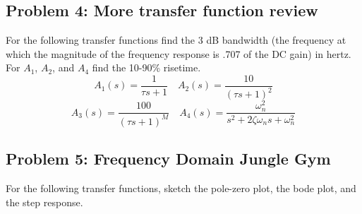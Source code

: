 \documentclass[11pt,twoside]{article}
\begin{document}
\subsection*{Problem 4: More transfer function review}
	For the following transfer functions find the 3 dB bandwidth (the frequency at which the magnitude of the frequency response is .707 of the DC gain) in hertz.  For $A_1$, $A_2$, and $A_4$ find the 10-90\% risetime.\\
\begin{equation*}
 A_1(s) = \frac{1}{\tau s+1} \quad A_2(s)= \frac{10}{(\tau s+1)^2} 
\end{equation*}
\begin{equation*}
 A_3(s) = \frac{100}{(\tau s+1)^M} \quad A_4(s)= \frac{\omega_n^2}{s^2+2\zeta\omega_n s+\omega_n^2} 
\end{equation*}

\subsection*{Problem 5: Frequency Domain Jungle Gym}
	For the following transfer functions, sketch the pole-zero plot, the bode plot, and the step response.
\end{document}
